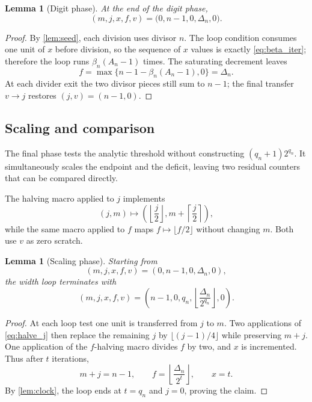 \documentclass[10pt]{article}
\newtheorem{lemma}[theorem]{Lemma}
\theoremstyle{definition}
\begin{document}
\begin{lemma}[Digit phase]
\label{lem:digits}
At the end of the digit phase,
\[
(m,j,x,f,v)=
\bigl(0,n-1,0,\Delta_n,0\bigr).
\]
\end{lemma}

\begin{proof}
By \cref{lem:seed}, each division uses divisor $n$. The loop condition
consumes one unit of $x$ before division, so the sequence of $x$ values is
exactly \eqref{eq:beta_iter}; therefore the loop runs $\beta_n(A_n-1)$ times.
The saturating decrement leaves
\[
f=\max\{n-1-\beta_n(A_n-1),0\}=\Delta_n.
\]
At each divider exit the two divisor pieces still sum to $n-1$; the final
transfer $v\to j$ restores $(j,v)=(n-1,0)$.
\end{proof}

\subsection{Scaling and comparison}

The final phase tests the analytic threshold without constructing
$(q_n+1)2^{q_n}$. It simultaneously scales the endpoint and the deficit,
leaving two residual counters that can be compared directly.

The halving macro applied to $j$ implements
\begin{equation}
\label{eq:halve_j}
(j,m)\longmapsto
\left(\left\lfloor\frac j2\right\rfloor,
 m+\left\lceil\frac j2\right\rceil\right),
\end{equation}
while the same macro applied to $f$ maps $f\mapsto\lfloor f/2\rfloor$ without
changing $m$. Both use $v$ as zero scratch.

\begin{lemma}[Scaling phase]
\label{lem:width}
Starting from
\[
(m,j,x,f,v)=(0,n-1,0,\Delta_n,0),
\]
the width loop terminates with
\[
(m,j,x,f,v)=
\left(n-1,0,q_n,
\left\lfloor\frac{\Delta_n}{2^{q_n}}\right\rfloor,0\right).
\]
\end{lemma}

\begin{proof}
At each loop test one unit is transferred from $j$ to $m$. Two applications of
\eqref{eq:halve_j} then replace the remaining $j$ by $\lfloor(j-1)/4\rfloor$
while preserving $m+j$. One application of the $f$-halving macro divides $f$
by two, and $x$ is incremented. Thus after $t$ iterations,
\[
m+j=n-1,
\qquad
f=\left\lfloor\frac{\Delta_n}{2^t}\right\rfloor,
\qquad
x=t.
\]
By \cref{lem:clock}, the loop ends at $t=q_n$ and $j=0$, proving the claim.
\end{proof}
\end{document}
